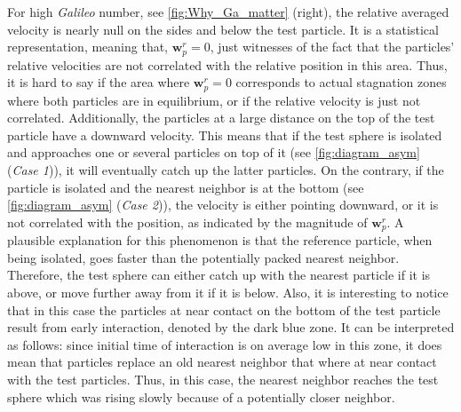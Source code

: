 

For high \textit{Galileo} number, see \ref{fig:Why_Ga_matter} (right), the relative averaged velocity is nearly null on the sides and below the test particle. 
It is a statistical representation, meaning that, $\textbf{w}_p^r = 0$, just witnesses of the fact that the particles' relative velocities are not correlated with the relative position in this area. 
Thus, it is hard to say if the area where $\textbf{w}_p^r = 0$ corresponds to actual stagnation zones where both particles are in equilibrium, or if the relative velocity is just not correlated. 
Additionally, the particles at a large distance on the top of the test particle have a downward velocity. 
This means that if the test sphere is isolated and approaches one or several  particles on top of it (see \ref{fig:diagram_asym} (\textit{Case 1})), it will eventually catch up the latter particles. 
On the contrary, if the particle is isolated and the nearest neighbor is at the bottom (see \ref{fig:diagram_asym} (\textit{Case 2})), the velocity is either pointing downward, or it is not correlated with the position, as indicated by the magnitude of $\textbf{w}_p^r$. 
A plausible explanation for this phenomenon is that the reference particle, when being isolated, goes faster than the potentially packed nearest neighbor.
Therefore, the test sphere can either catch up with the nearest particle if it is above, or move further away from it if it is below.
Also, it is interesting to notice that in this case the particles at near contact on the bottom of the test particle result from early interaction, denoted by the dark blue zone. 
It can be interpreted as follows: since 
initial time of interaction is on average low in this zone, it does mean that particles replace an old nearest neighbor that where at near contact with the test particles. 
Thus, in this case, the nearest neighbor reaches the test sphere which was rising slowly because of a potentially closer neighbor. 


